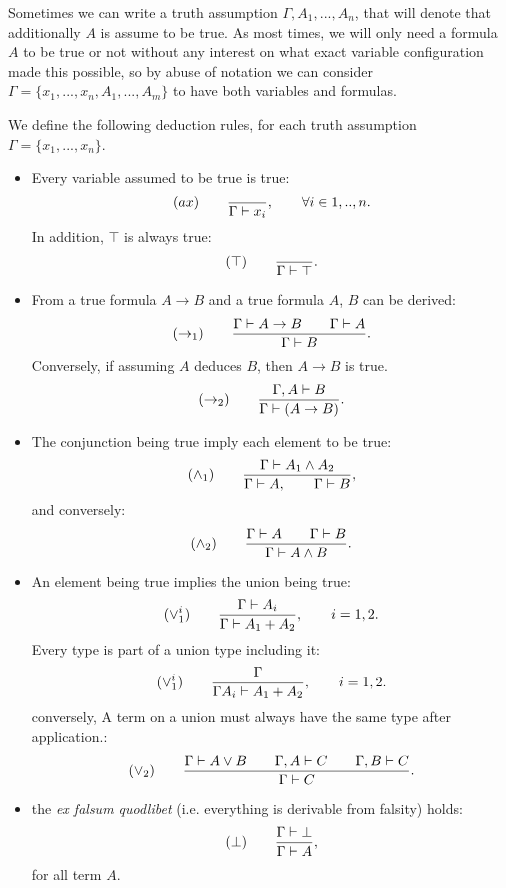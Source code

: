 Sometimes we can write a truth assumption $\Gamma, A_1, ..., A_n$, that will denote that additionally $A$ is assume to be true. As most times, we will only need a formula $A$ to be true or not without any interest on what exact variable configuration made this possible, so by abuse of notation we can consider $\Gamma = \{x_1, ..., x_n, A_1, ..., A_m\}$ to have both variables and formulas.  
\begin{definition}
  We define the following deduction rules, for each truth assumption $\Gamma=\{x_1,...,x_n\}$.
  \begin{itemize}
  \item Every variable assumed to be true is true:
    $$  (ax)\qquad  {\displaystyle \over \Gamma \vdash x_i},\qquad \forall i \in 1,..,n.$$
    In addition, $\top$ is always true:
    $$  (\top)\qquad  {\displaystyle \over \Gamma \vdash \top}.$$
  \item From a true formula $A\to B$ and a true formula $A$, $B$ can be derived:
    $$(\to_1)\qquad  {\displaystyle \Gamma \vdash A \to B\qquad \Gamma \vdash A      \over \Gamma \vdash B}.$$
    Conversely, if assuming $A$ deduces $B$, then $A\to B$ is true.
    $$(\to_2)\qquad  {\displaystyle \Gamma, A \vdash B      \over \Gamma \vdash (A\to B)}.$$
    
  \item The conjunction being true imply each element to be true:
    $$(\land_1) \qquad {\displaystyle \Gamma\vdash A_1\land A_2 \over \Gamma \vdash A, \qquad \Gamma \vdash B },$$
    and conversely:
    $$(\land_2) \qquad {\displaystyle \Gamma\vdash A\qquad \Gamma\vdash B \over \Gamma \vdash  A \land B}.$$
  \item An element being true implies the union being true:
    $$  (\lor_1^i)\qquad  {\displaystyle\Gamma \vdash A_i \over \Gamma \vdash A_1+A_2},\qquad  i=  1,2.$$
    Every type is part of a union type including it:
    $$  (\lor_1^i)\qquad  {\displaystyle\Gamma \over \Gamma A_i  \vdash A_1+A_2},\qquad  i=  1,2.$$
    conversely, A term on a union must always have the same type after application.:
    $$(\lor_2) \qquad {\displaystyle \Gamma\vdash A\lor B\qquad \Gamma, A\vdash C\qquad \Gamma, B\vdash C \over \Gamma \vdash C}.$$
  \item the \emph{ex falsum quodlibet} (i.e. everything is derivable from falsity)  holds:
    $$  (\bot)\qquad  {\displaystyle\Gamma \vdash \bot \over \Gamma \vdash A},$$
    for all term $A$.
  \end{itemize}
\end{definition}



